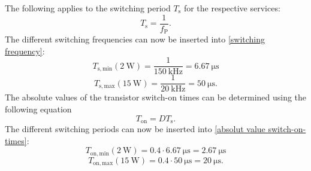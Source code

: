  \begin{solutionblock}
 The following applies to the switching period $T_\mathrm{s}$ for the respective services:  
 \begin{equation}
    T_\mathrm{s} = \frac{1}{f_\mathrm{P}}. \label{switching frequency}
 \end{equation}
 The different switching frequencies can now be inserted into \ref{switching frequency}:
 \begin{equation}
    T_\mathrm{s,min}(\SI{2}{\watt}) = \frac{1}{\SI{150}{\kilo \hertz}}= \SI{6.67}{\micro \s}
 \end{equation}
 \begin{equation}
    T_\mathrm{s,max}(\SI{15}{\watt}) = \frac{1}{\SI{20}{\kilo \hertz}}= \SI{50}{\micro \s}.
 \end{equation}
 The absolute values of the transistor switch-on times can be determined using the following equation
 \begin{equation}
    T_\mathrm{on} = D T_\mathrm{s}. \label{absolut value switch-on-times}
 \end{equation}
 The different switching periods can now be inserted into \ref{absolut value switch-on-times}:
 \begin{equation}
    T_\mathrm{on,min}(\SI{2}{\watt}) = 0.4 \cdot \SI{6.67}{\micro \s} = \SI{2.67}{\micro \s}
 \end{equation}
 \begin{equation}
    T_\mathrm{on,max}(\SI{15}{\watt}) = 0.4 \cdot \SI{50}{\micro \s}= \SI{20}{\micro \s}.
 \end{equation}
 \end{solutionblock}

\begin{solutionblock}
       
\end{solutionblock}
    


